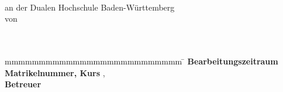 
\begin{titlepage}
    \begin{figure}
\centering
\begin{minipage}{.4\textwidth}
\end{minipage}%
\begin{minipage}{.4\textwidth}
    \begin{flushright}
    
    \end{flushright}
\end{minipage}
\end{figure}
	\enlargethispage{20mm}
	\begin{center}
	  \vspace*{12mm}	{\large\textbf \titel }\\
	  \vspace*{12mm}	{\large\textbf \arbeit}\\
	  
	  \vspace*{12mm}	\studiengang\\
	  \vspace*{3mm} 	an der Dualen Hochschule Baden-Württemberg \dhbw\\
	  \vspace*{12mm}	von\\
	  \vspace*{3mm} 	{\large\textbf \autor}\\
	  \vspace*{12mm}	\datumAbgabe\\
	\end{center}
	\vfill
	\begin{spacing}{1.2}
	\begin{tabbing}
		mmmmmmmmmmmmmmmmmmmmmmmmmm     \= \kill
		\textbf{Bearbeitungszeitraum}  \>  \zeitraum\\
		\textbf{Matrikelnummer, Kurs}  \>  \martrikelnr, \kurs\\
		\textbf{Betreuer}              \>  \betreuer\\
	\end{tabbing}
	\end{spacing}
\end{titlepage}
